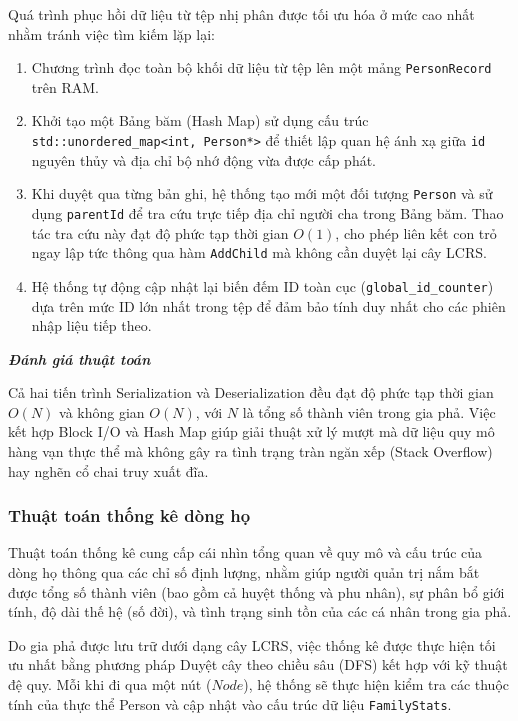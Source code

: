 Quá trình phục hồi dữ liệu từ tệp nhị phân được tối ưu hóa ở mức cao nhất nhằm tránh việc tìm kiếm lặp lại:
\begin{enumerate}
	\item Chương trình đọc toàn bộ khối dữ liệu từ tệp lên một mảng \texttt{PersonRecord} trên RAM.
	\item Khởi tạo một Bảng băm (Hash Map) sử dụng cấu trúc \texttt{std::unordered\_map<int, Person*>} để thiết lập quan hệ ánh xạ giữa \texttt{id} nguyên thủy và địa chỉ bộ nhớ động vừa được cấp phát.
	\item Khi duyệt qua từng bản ghi, hệ thống tạo mới một đối tượng \texttt{Person} và sử dụng \texttt{parentId} để tra cứu trực tiếp địa chỉ người cha trong Bảng băm. Thao tác tra cứu này đạt độ phức tạp thời gian $O(1)$, cho phép liên kết con trỏ ngay lập tức thông qua hàm \texttt{AddChild} mà không cần duyệt lại cây LCRS.
	\item Hệ thống tự động cập nhật lại biến đếm ID toàn cục (\texttt{global\_id\_counter}) dựa trên mức ID lớn nhất trong tệp để đảm bảo tính duy nhất cho các phiên nhập liệu tiếp theo.
\end{enumerate}

\textbf{\textit{Đánh giá thuật toán}}

Cả hai tiến trình Serialization và Deserialization đều đạt độ phức tạp thời gian $O(N)$ và không gian $O(N)$, với $N$ là tổng số thành viên trong gia phả. Việc kết hợp Block I/O và Hash Map giúp giải thuật xử lý mượt mà dữ liệu quy mô hàng vạn thực thể mà không gây ra tình trạng tràn ngăn xếp (Stack Overflow) hay nghẽn cổ chai truy xuất đĩa.

\subsubsection{Thuật toán thống kê dòng họ}

Thuật toán thống kê cung cấp cái nhìn tổng quan về quy mô và cấu trúc của dòng họ thông qua các chỉ số định lượng, nhằm giúp người quản trị nắm bắt được tổng số thành viên (bao gồm cả huyệt thống và phu nhân), sự phân bổ giới tính, độ dài thế hệ (số đời), và tình trạng sinh tồn của các cá nhân trong gia phả.

Do gia phả được lưu trữ dưới dạng cây LCRS, việc thống kê được thực hiện tối ưu nhất bằng phương pháp Duyệt cây theo chiều sâu (DFS) kết hợp với kỹ thuật đệ quy. Mỗi khi đi qua một nút ($Node$), hệ thống sẽ thực hiện kiểm tra các thuộc tính của thực thể Person và cập nhật vào cấu trúc dữ liệu \texttt{FamilyStats}.


